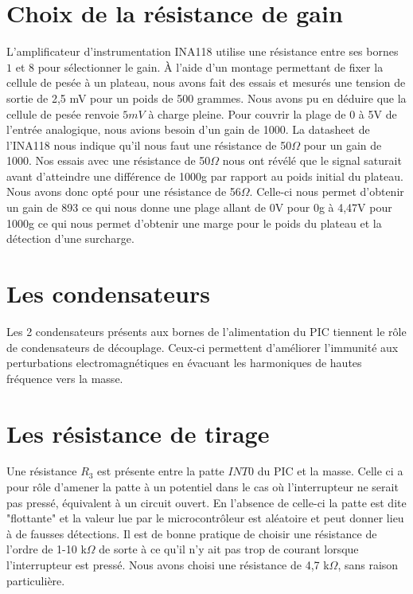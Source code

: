 \documentclass[a4paper,11pt,titlepage]{article}
\begin{document}
\section{Choix de la résistance de gain}

L'amplificateur d'instrumentation INA118 utilise une résistance entre ses bornes $1$ et $8$ pour sélectionner le gain. À l'aide d'un montage permettant de fixer la cellule de pesée à un plateau, nous avons fait des essais et mesurés une tension de sortie de 2,5 mV pour un poids de 500 grammes. Nous avons pu en déduire que la cellule de pesée renvoie $5mV$ à charge pleine. Pour couvrir la plage de 0 à 5V de l'entrée analogique, nous avions besoin d'un gain de 1000. La datasheet de l'INA118 nous indique qu'il nous faut une résistance de 50$\Omega$ pour un gain de 1000. Nos essais avec une résistance de 50$\Omega$ nous ont révélé que le signal saturait avant d'atteindre une différence de 1000g par rapport au poids initial du plateau. Nous avons donc opté pour une résistance de 56$\Omega$. Celle-ci nous permet d'obtenir un gain de 893 ce qui nous donne une plage allant de 0V pour 0g à 4,47V pour 1000g ce qui nous permet d'obtenir une marge pour le poids du plateau et la détection d'une surcharge.

\section{Les condensateurs}

Les 2 condensateurs présents aux bornes de l'alimentation du PIC tiennent le rôle de condensateurs de découplage. Ceux-ci permettent d'améliorer l'immunité aux perturbations electromagnétiques en évacuant les harmoniques de hautes fréquence vers la masse.

\section{Les résistance de tirage}

Une résistance $R_3$ est présente entre la patte $INT0$ du PIC et la masse. Celle ci a pour rôle d'amener la patte à un potentiel dans le cas où l'interrupteur ne serait pas pressé, équivalent à un circuit ouvert. En l'absence de celle-ci la patte est dite "flottante" et la valeur lue par le microcontrôleur est aléatoire et peut donner lieu à de fausses détections. Il est de bonne pratique de choisir une résistance de l'ordre de 1-10 k$\Omega$ de sorte à ce qu'il n'y ait pas trop de courant lorsque l'interrupteur est pressé. Nous avons choisi une résistance de 4,7 k$\Omega$, sans raison particulière.\\
\end{document}
